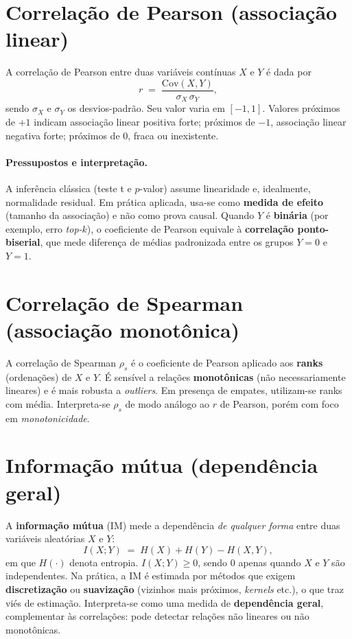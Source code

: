 \documentclass[12pt,a4paper]{article}
\begin{document}
\section{Correlação de Pearson (associação linear)}\label{sec:pearson}
A correlação de Pearson entre duas variáveis contínuas $X$ e $Y$ é dada por
\begin{equation}
r \;=\; \frac{\mathrm{Cov}(X,Y)}{\sigma_X\,\sigma_Y},
\end{equation}
sendo $\sigma_X$ e $\sigma_Y$ os desvios-padrão. Seu valor varia em $[-1,1]$. Valores próximos de $+1$ indicam associação linear positiva forte; próximos de $-1$, associação linear negativa forte; próximos de $0$, fraca ou inexistente.
\paragraph{Pressupostos e interpretação.} A inferência clássica (teste t e $p$-valor) assume linearidade e, idealmente, normalidade residual. Em prática aplicada, usa-se como \textbf{medida de efeito} (tamanho da associação) e não como prova causal. Quando $Y$ é \textbf{binária} (por exemplo, erro \emph{top-$k$}), o coeficiente de Pearson equivale à \textbf{correlação ponto-biserial}, que mede diferença de médias padronizada entre os grupos $Y=0$ e $Y=1$.

\section{Correlação de Spearman (associação monotônica)}\label{sec:spearman}
A correlação de Spearman $\rho_s$ é o coeficiente de Pearson aplicado aos \textbf{ranks} (ordenações) de $X$ e $Y$. É sensível a relações \textbf{monotônicas} (não necessariamente lineares) e é mais robusta a \emph{outliers}. Em presença de empates, utilizam-se ranks com média. Interpreta-se $\rho_s$ de modo análogo ao $r$ de Pearson, porém com foco em \emph{monotonicidade}.

\section{Informação mútua (dependência geral)}
A \textbf{informação mútua} (IM) mede a dependência \emph{de qualquer forma} entre duas variáveis aleatórias $X$ e $Y$:
\begin{equation}
I(X;Y) \;=\; H(X) + H(Y) - H(X,Y),
\end{equation}
em que $H(\cdot)$ denota entropia. $I(X;Y) \ge 0$, sendo $0$ apenas quando $X$ e $Y$ são independentes. Na prática, a IM é estimada por métodos que exigem \textbf{discretização} ou \textbf{suavização} (vizinhos mais próximos, \emph{kernels} etc.), o que traz viés de estimação. Interpreta-se como uma medida de \textbf{dependência geral}, complementar às correlações: pode detectar relações não lineares ou não monotônicas.
\end{document}
